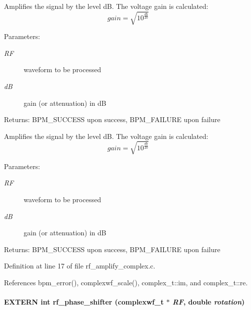 Amplifies the signal by the level dB. The voltage gain is calculated: \[ gain = \sqrt{ 10^{ \frac{db}{20} } } \] \begin{Desc}
\item[Parameters:]
\begin{description}
\item[{\em RF}]waveform to be processed \item[{\em dB}]gain (or attenuation) in dB \end{description}
\end{Desc}
\begin{Desc}
\item[Returns:]BPM\_\-SUCCESS upon success, BPM\_\-FAILURE upon failure\end{Desc}
Amplifies the signal by the level dB. The voltage gain is calculated: \[ gain = \sqrt{ 10^{ \frac{db}{20} } } \] \begin{Desc}
\item[Parameters:]
\begin{description}
\item[{\em RF}]waveform to be processed \item[{\em dB}]gain (or attenuation) in dB \end{description}
\end{Desc}
\begin{Desc}
\item[Returns:]BPM\_\-SUCCESS upon success, BPM\_\-FAILURE upon failure \end{Desc}


Definition at line 17 of file rf\_\-amplify\_\-complex.c.

References bpm\_\-error(), complexwf\_\-scale(), complex\_\-t::im, and complex\_\-t::re.
\paragraph[rf\_\-phase\_\-shifter]{\setlength{\rightskip}{0pt plus 5cm}EXTERN int rf\_\-phase\_\-shifter ({\bf complexwf\_\-t} $\ast$ {\em RF}, \/  double {\em rotation})}\hfill\label{group__rf_g8deeec993e7cabbb09afc9d97e570fc3}


